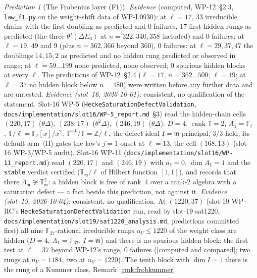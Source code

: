 \documentclass[11pt]{article}
\theoremstyle{remark}
\newtheorem{prediction}[theorem]{Prediction}
\newcommand{\F}{\mathbb{F}}
\newcommand{\Z}{\mathbb{Z}}
\newcommand{\Fl}{\F_\ell}
\newcommand{\T}{\mathbb{T}}
\newcommand{\m}{\mathfrak{m}}
\newcommand{\CMPD}{\textsf{[computed and compared]}}   %
\begin{document}
\begin{prediction}[The Frobenius layer (F1)]
\emph{Evidence} (computed, WP-12~\S2.3, \texttt{law\_f1.py} on the weight-shift data of WP-L0930): at $\ell=17$, $33$ irreducible chains
with the first doubling as predicted and $0$ failures, $17$ first hidden rungs as predicted (the three $\theta^j(\Delta E_6)$ at
$n=322,340,358$ included) and $0$ failures; at $\ell=19$, $49$ and $9$ (plus $n=362,366$ beyond $360$), $0$ failures; at
$\ell=29,37,47$ the doublings $14,15,2$ as predicted and no hidden rung predicted or observed in range; at $\ell=59\ldots199$ none
predicted, none observed; $0$ spurious hidden blocks at every $\ell$. The predictions of WP-12~\S2.4 ($\ell=17$, $n=362\ldots500$;
$\ell=19$; at $\ell=37$ no hidden block below $n=480$) were written before any further data and are untested.
\emph{Evidence (slot~16, 2026-10-01)}: consistent, no qualification of the statement. Slot-16 WP-5
(\texttt{HeckeSaturationDefectValidation}, \texttt{docs/implementation/slot16/WP-5\_report.md}~\S3) read the hidden-chain cells $(220,17)$
($\theta\Delta$), $(238,17)$ ($\theta^2\Delta$), $(246,19)$ ($\theta\Delta$): $D=4$, $\operatorname{rank}\T=2$, $A_1=\Fl$,
$\T/\ell=\Fl[x]/x^2$, $\T^{\mathrm{sat}}/\T=\Z/\ell$, the defect ideal $I=\m$ principal, $3/3$ held; its default arm~(H) gates the
law's $j=1$ onset at $\ell=13$, the cell $(168,13)$ (slot-16 WP-3/WP-5 audit). Slot-16 WP-11
(\texttt{docs/implementation/slot16/WP-11\_report.md}) read $(220,17)$ and $(246,19)$ with $a_\ell=0$, $\dim A_1=1$ and the \texttt{stable}
verdict certified ($\T_\m/\ell$ of Hilbert function $[1,1]$), and records that there $\Lambda_\m\not\cong\T_\m^2$: a hidden block is free
of rank~$4$ over a rank-$2$ algebra with a saturation defect --- a fact beside this prediction, not against it.
\emph{Evidence (slot~19, 2026-10-04)}: consistent, no qualification. At $(1220,37)$ (slot-19 WP-RC's \texttt{HeckeSaturationDefectValidation} run, read by slot-19 sat1220,
\texttt{docs/implementation/slot19/sat1220\_analysis.md}, predictions committed first) all nine $\F_{37}$-rational irreducible rungs $n_V\le1220$ of the weight class are hidden
($D=4$, $A_1=\F_{37}$, $I=\m$) and there is no spurious hidden block: the first test at $\ell=37$ beyond WP-12's range, $0$ failures (\CMPD; two rungs at $n_V=1184$, two at
$n_V=1220$). The tenth block with $\dim I=1$ there is the rung of a Kummer class, Remark~\ref{rmk:frobkummer}.


\end{prediction}
\end{document}
